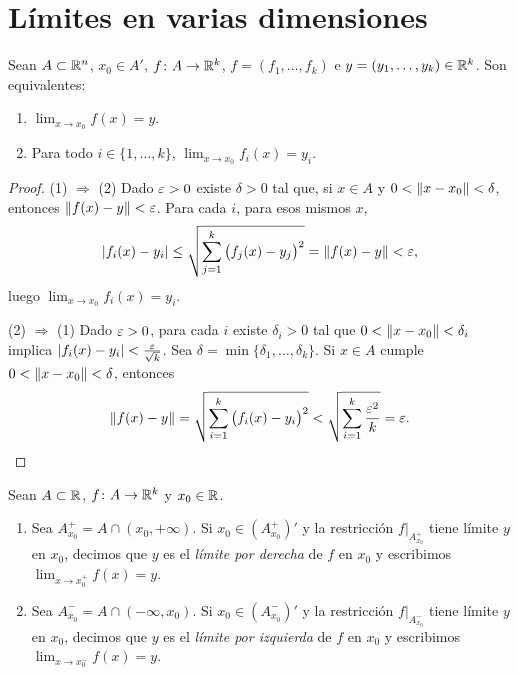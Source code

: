 \section{Límites en varias dimensiones}

\begin{prop}
  Sean \(A \subset \mathbb{R}^n\), \(x_0 \in A'\), \(f\colon A \to \mathbb{R}^k\), \(f = (f_1, \dots, f_k)\) e \(y = (y_1, \dots, y_k) \in \mathbb{R}^k\). Son equivalentes:
  \begin{enumerate}[label=(\arabic*)]
    \item \(\lim_{x \to x_0} f(x) = y\).
    \item Para todo \(i \in \{1, \dots, k\}\), \(\lim_{x \to x_0} f_i(x) = y_i\).
  \end{enumerate}
\end{prop}

\begin{proof}
  (1) \(\Rightarrow\) (2) Dado \(\varepsilon > 0\) existe \(\delta > 0\) tal que, si \(x \in A\) y \(0 < \left\lVert x - x_0 \right\rVert < \delta\), entonces \(\left\lVert f(x) - y \right\rVert < \varepsilon\). Para cada \(i\), para esos mismos \(x\),
  \[
    |f_i(x) - y_i| \leq \sqrt{\sum_{j=1}^{k} {\bigl( f_j(x) - y_j \bigr)}^2} = \left\lVert f(x) - y \right\rVert < \varepsilon,
  \]
  luego \(\lim_{x \to x_0} f_i(x) = y_i\).

  (2) \(\Rightarrow\) (1) Dado \(\varepsilon > 0\), para cada \(i\) existe \(\delta_i > 0\) tal que \(0 < \left\lVert x - x_0 \right\rVert < \delta_i\) implica \(|f_i(x) - y_i| < \frac{\varepsilon}{\sqrt{k}}\). Sea \(\delta = \min\{\delta_1, \dots, \delta_k\}\). Si \(x \in A\) cumple \(0 < \left\lVert x - x_0 \right\rVert < \delta\), entonces
  \[
    \left\lVert f(x) - y \right\rVert = \sqrt{\sum_{i=1}^{k} {\bigl( f_i(x) - y_i \bigr)}^2} < \sqrt{\sum_{i=1}^{k} \frac{\varepsilon^2}{k}} = \varepsilon. \qedhere
  \]
\end{proof}

\begin{definition}
  Sean \(A \subset \mathbb{R}\), \(f\colon A \to \mathbb{R}^k\) y \(x_0 \in \mathbb{R}\).
  \begin{enumerate}[label=(\arabic*)]
    \item Sea \(A_{x_0}^{+} = A \cap (x_0, +\infty)\). Si \(x_0 \in {(A_{x_0}^{+})}'\) y la restricción \(f|_{A_{x_0}^{+}}\) tiene límite \(y\) en \(x_0\), decimos que \(y\) es el \emph{límite por derecha} de \(f\) en \(x_0\) y escribimos \(\lim_{x \to x_0^{+}} f(x) = y\).
    \item Sea \(A_{x_0}^{-} = A \cap (-\infty, x_0)\). Si \(x_0 \in {(A_{x_0}^{-})}'\) y la restricción \(f|_{A_{x_0}^{-}}\) tiene límite \(y\) en \(x_0\), decimos que \(y\) es el \emph{límite por izquierda} de \(f\) en \(x_0\) y escribimos \(\lim_{x \to x_0^{-}} f(x) = y\).
  \end{enumerate}
\end{definition}

